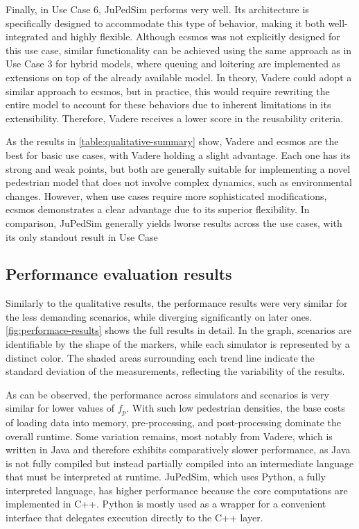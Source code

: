 \documentclass[twoside, 11pt]{article}
\begin{document}
Finally, in Use Case 6, JuPedSim performs very well. Its architecture is specifically designed to accommodate this type of behavior, making it both well-integrated and highly flexible. Although \gls{ecsmos} was not explicitly designed for this use case, similar functionality can be achieved using the same approach as in Use Case 3 for hybrid models, where queuing and loitering are implemented as extensions on top of the already available model. In theory, Vadere could adopt a similar approach to \gls{ecsmos}, but in practice, this would require rewriting the entire model to account for these behaviors due to inherent limitations in its extensibility. Therefore, Vadere receives a lower score in the reusability criteria.


As the results in \autoref{table:qualitative-summary} show, Vadere and \gls{ecsmos} are the best for basic use cases, with Vadere holding a slight advantage. Each one has its strong and weak points, but both are generally suitable for implementing a novel pedestrian model that does not involve complex dynamics, such as environmental changes. However, when use cases require more sophisticated modifications, \gls{ecsmos} demonstrates a clear advantage due to its superior flexibility. In comparison, JuPedSim generally yields lworse results across the use cases, with its only standout result in Use Case


\subsection{Performance evaluation results}

Similarly to the qualitative results, the performance results were very similar for the less demanding scenarios, while diverging significantly on later ones. \autoref{fig:performace-results} shows the full results in detail. In the graph, scenarios are identifiable by the shape of the markers, while each simulator is represented by a distinct color. The shaded areas surrounding each trend line indicate the standard deviation of the measurements, reflecting the variability of the results.

As can be observed, the performance across simulators and scenarios is very similar for lower values of $f_p$. With such low pedestrian densities, the base costs of loading data into memory, pre-processing, and post-processing dominate the overall runtime. Some variation remains, most notably from Vadere, which is written in Java and therefore exhibits comparatively slower performance, as Java is not fully compiled but instead partially compiled into an intermediate language that must be interpreted at runtime. JuPedSim, which uses Python, a fully interpreted language, has higher performance because the core computations are implemented in C++. Python is mostly used as a wrapper for a convenient interface that delegates execution directly to the C++ layer.
\end{document}
